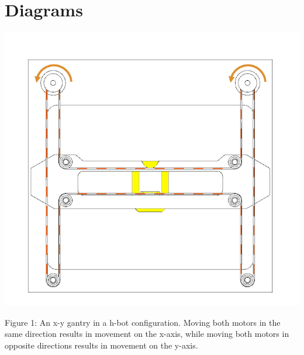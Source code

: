 \documentclass{article}
\begin{document}
\clearpage

\section*{Diagrams}

\centerline{\includegraphics[scale=.5]{hbotimage}}
\centering

Figure 1: An x-y gantry in a h-bot configuration. Moving both motors in the same direction results in movement on the x-axis, while moving both motors in opposite directions results in movement on the y-axis.
\end{document}
